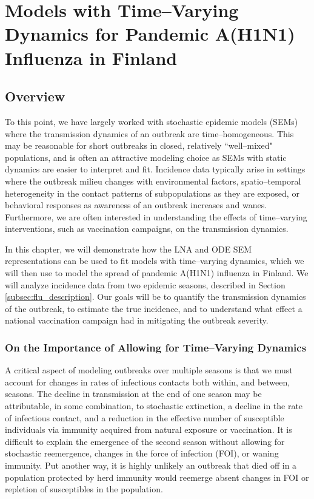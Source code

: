 \chapter{Models with Time--Varying Dynamics for Pandemic A(H1N1) Influenza in Finland}
\label{chap:lna_extensions}

\section{Overview}
\label{sec:lna_extensions_overview}
To this point, we have largely worked with stochastic epidemic models (SEMs) where the transmission dynamics of an outbreak are time--homogeneous. This may be reasonable for short outbreaks in closed, relatively ``well--mixed" populations, and is often an attractive modeling choice as SEMs with static dynamics are easier to interpret and fit. Incidence data typically arise in settings where the outbreak milieu changes with environmental factors, spatio--temporal heterogeneity in the contact patterns of subpopulations as they are exposed, or behavioral responses as awareness of an outbreak increases and wanes. Furthermore, we are often interested in understanding the effects of time--varying interventions, such as vaccination campaigns, on the transmission dynamics. 

In this chapter, we will demonstrate how the LNA and ODE SEM representations can be used to fit models with time--varying dynamics, which we will then use to model the spread of pandemic A(H1N1) influenza in Finland. We will analyze incidence data from two epidemic seasons, described in Section \ref{subsec:flu_description}. Our goals will be to quantify the transmission dynamics of the outbreak, to estimate the true incidence, and to understand what effect a national vaccination campaign had in mitigating the outbreak severity. 


\subsection{On the Importance of Allowing for Time--Varying Dynamics}
\label{subsec:tparam_motivation}

A critical aspect of modeling outbreaks over multiple seasons is that we must account for changes in rates of infectious contacts both within, and between, seasons. The decline in transmission at the end of one season may be attributable, in some combination, to stochastic extinction, a decline in the rate of infectious contact, and a reduction in the effective number of susceptible individuals via immunity acquired from natural exposure or vaccination. It is difficult to explain the emergence of the second season without allowing for stochastic reemergence, changes in the force of infection (FOI), or waning immunity. Put another way, it is highly unlikely an outbreak that died off in a population protected by herd immunity would reemerge absent changes in FOI or repletion of susceptibles in the population. 

